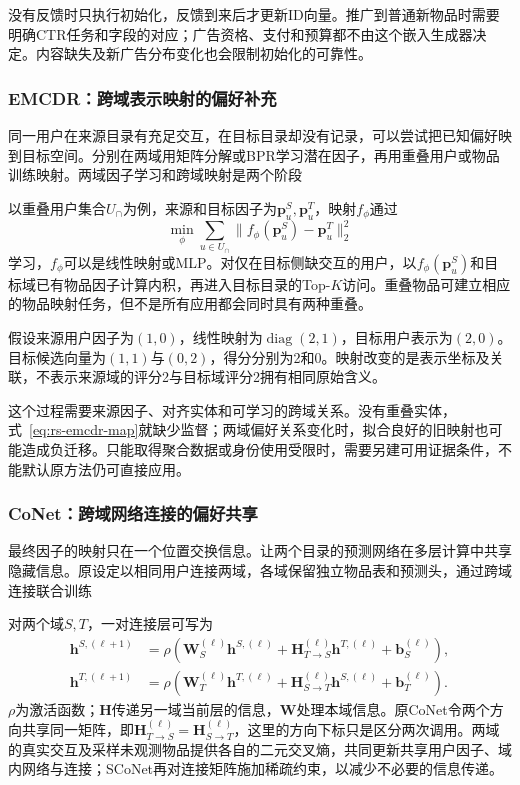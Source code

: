 没有反馈时只执行初始化，反馈到来后才更新ID向量。推广到普通新物品时需要明确CTR任务和字段的对应；广告资格、支付和预算都不由这个嵌入生成器决定。内容缺失及新广告分布变化也会限制初始化的可靠性。

\subsubsection{EMCDR：跨域表示映射的偏好补充}
\label{sec:rs-emcdr}

同一用户在来源目录有充足交互，在目标目录却没有记录，可以尝试把已知偏好映到目标空间。分别在两域用矩阵分解或BPR学习潜在因子，再用重叠用户或物品训练映射。两域因子学习和跨域映射是两个阶段

以重叠用户集合$U_{\cap}$为例，来源和目标因子为$\bm{p}_u^S,\bm{p}_u^T$，映射$f_\phi$通过
\begin{equation}
  \min_\phi\sum_{u\in U_{\cap}}
     \lVert f_\phi(\bm{p}_u^S)-\bm{p}_u^T\rVert_2^2
  \label{eq:rs-emcdr-map}
\end{equation}
学习，$f_\phi$可以是线性映射或MLP。对仅在目标侧缺交互的用户，以$f_\phi(\bm{p}_u^S)$和目标域已有物品因子计算内积，再进入目标目录的Top-$K$访问。重叠物品可建立相应的物品映射任务，但不是所有应用都会同时具有两种重叠。

假设来源用户因子为$(1,0)$，线性映射为$\operatorname{diag}(2,1)$，目标用户表示为$(2,0)$。目标候选向量为$(1,1)$与$(0,2)$，得分分别为2和0。映射改变的是表示坐标及关联，不表示来源域的评分2与目标域评分2拥有相同原始含义。

这个过程需要来源因子、对齐实体和可学习的跨域关系。没有重叠实体，式~\eqref{eq:rs-emcdr-map}就缺少监督；两域偏好关系变化时，拟合良好的旧映射也可能造成负迁移。只能取得聚合数据或身份使用受限时，需要另建可用证据条件，不能默认原方法仍可直接应用。

\subsubsection{CoNet：跨域网络连接的偏好共享}
\label{sec:rs-conet}

最终因子的映射只在一个位置交换信息。让两个目录的预测网络在多层计算中共享隐藏信息。原设定以相同用户连接两域，各域保留独立物品表和预测头，通过跨域连接联合训练

对两个域$S,T$，一对连接层可写为
\begin{align}
  \bm{h}^{S,(\ell+1)}
    &=\rho(\bm{W}_S^{(\ell)}\bm{h}^{S,(\ell)}
           +\bm{H}_{T\to S}^{(\ell)}\bm{h}^{T,(\ell)}
           +\bm{b}_S^{(\ell)}),\\
  \bm{h}^{T,(\ell+1)}
    &=\rho(\bm{W}_T^{(\ell)}\bm{h}^{T,(\ell)}
           +\bm{H}_{S\to T}^{(\ell)}\bm{h}^{S,(\ell)}
           +\bm{b}_T^{(\ell)}).
  \label{eq:rs-conet-cross}
\end{align}
$\rho$为激活函数；$\bm{H}$传递另一域当前层的信息，$\bm{W}$处理本域信息。原CoNet令两个方向共享同一矩阵，即$\bm{H}_{T\to S}^{(\ell)}=\bm{H}_{S\to T}^{(\ell)}$，这里的方向下标只是区分两次调用。两域的真实交互及采样未观测物品提供各自的二元交叉熵，共同更新共享用户因子、域内网络与连接；SCoNet再对连接矩阵施加稀疏约束，以减少不必要的信息传递。

